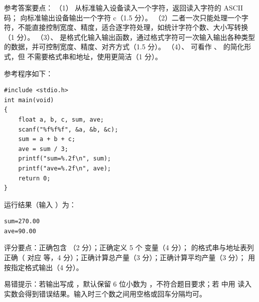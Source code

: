 \documentclass[a4paper,11pt]{article}
\begin{document}
\q 参考答案要点：
（1） 从标准输入设备读入一个字符，返回读入字符的 ASCII 码； 向标准输出设备输出一个字符 c（1.5 分）。
（2）二者一次只能处理一个字符，不能直接控制宽度、精度，适合逐字符处理，如统计字符个数、大小写转换（1 分）。
（3）、 是格式化输入输出函数，通过格式字符可一次输入输出各种类型的数据，并可控制宽度、精度、对齐方式（1.5 分）。
（4）、 可看作 、 的简化形式，但  不需要格式串和地址，使用更简洁（1 分）。


\q 参考程序如下：
\begin{lstlisting}[language={[custom]C}]
#include <stdio.h>
int main(void)
{
    float a, b, c, sum, ave;
    scanf("%f%f%f", &a, &b, &c);
    sum = a + b + c;
    ave = sum / 3;
    printf("sum=%.2f\n", sum);
    printf("ave=%.2f\n", ave);
    return 0;
}
\end{lstlisting}
\begin{analysis}运行结果（输入 ）为：
\begin{lstlisting}
sum=270.00
ave=90.00
\end{lstlisting}
评分要点：正确包含 （2 分）；正确定义 5 个  变量（4 分）； 的格式串与地址表列正确（ 对应  等，4 分）；正确计算总产量（3 分）；正确计算平均产量（3 分）； 用  按指定格式输出（4 分）。\end{analysis}
\begin{analysis}易错提示：若输出写成 ，默认保留 6 位小数为 ，不符合题目要求；若  中用  读入实数会得到错误结果。输入时三个数之间用空格或回车分隔均可。\end{analysis}
\end{document}
